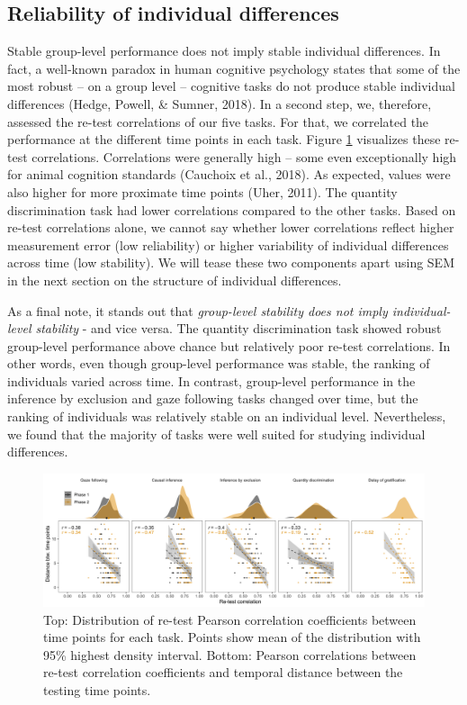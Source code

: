 \documentclass[
  man,floatsintext]{apa6}
\begin{document}
\hypertarget{reliability-of-individual-differences}{%
\subsection{Reliability of individual differences}\label{reliability-of-individual-differences}}

Stable group-level performance does not imply stable individual differences. In fact, a well-known paradox in human cognitive psychology states that some of the most robust -- on a group level -- cognitive tasks do not produce stable individual differences (Hedge, Powell, \& Sumner, 2018). In a second step, we, therefore, assessed the re-test correlations of our five tasks. For that, we correlated the performance at the different time points in each task. Figure \ref{fig:relplot} visualizes these re-test correlations. Correlations were generally high -- some even exceptionally high for animal cognition standards (Cauchoix et al., 2018). As expected, values were also higher for more proximate time points (Uher, 2011). The quantity discrimination task had lower correlations compared to the other tasks. Based on re-test correlations alone, we cannot say whether lower correlations reflect higher measurement error (low reliability) or higher variability of individual differences across time (low stability). We will tease these two components apart using SEM in the next section on the structure of individual differences.

As a final note, it stands out that \emph{group-level stability does not imply individual-level stability} - and vice versa. The quantity discrimination task showed robust group-level performance above chance but relatively poor re-test correlations. In other words, even though group-level performance was stable, the ranking of individuals varied across time. In contrast, group-level performance in the inference by exclusion and gaze following tasks changed over time, but the ranking of individuals was relatively stable on an individual level. Nevertheless, we found that the majority of tasks were well suited for studying individual differences.

\begin{figure}
\includegraphics[width=1\linewidth]{./figures/reliability} \caption{Top: Distribution of re-test Pearson correlation coefficients between time points for each task. Points show mean of the distribution with 95\% highest density interval. Bottom: Pearson correlations between re-test correlation coefficients and temporal distance between the testing time points.}\label{fig:relplot}
\end{figure}
\end{document}
